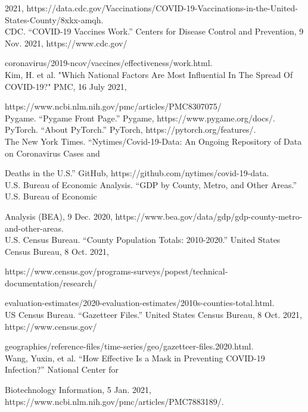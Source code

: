 \documentclass[fontsize=11pt]{article}
\begin{document}
    2021, https://data.cdc.gov/Vaccinations/COVID-19-Vaccinations-in-the-United-States-County/8xkx-amqh. \\
    CDC. “COVID-19 Vaccines Work.” Centers for Disease Control and Prevention, 9 Nov. 2021, https://www.cdc.gov/
    
    coronavirus/2019-ncov/vaccines/effectiveness/work.html. \\
    Kim, H. et al. "Which National Factors Are Most Influential In The Spread Of COVID-19?" PMC, 16 July 2021, 
    
    https://www.ncbi.nlm.nih.gov/pmc/articles/PMC8307075/  \\
    Pygame. “Pygame Front Page.” Pygame, https://www.pygame.org/docs/. \\
    PyTorch. “About PyTorch.” PyTorch, https://pytorch.org/features/. \\
    The New York Times. “Nytimes/Covid-19-Data: An Ongoing Repository of Data on Coronavirus Cases and

    Deaths in the U.S.” GitHub, https://github.com/nytimes/covid-19-data. \\
    U.S. Bureau of Economic Analysis. “GDP by County, Metro, and Other Areas.” U.S. Bureau of Economic

    Analysis (BEA), 9 Dec. 2020, https://www.bea.gov/data/gdp/gdp-county-metro-and-other-areas. \\
    U.S. Census Bureau. “County Population Totals: 2010-2020.” United States Census Bureau, 8 Oct. 2021,

    https://www.census.gov/programs-surveys/popest/technical-documentation/research/

    evaluation-estimates/2020-evaluation-estimates/2010s-counties-total.html. \\
    US Census Bureau. “Gazetteer Files.” United States Census Bureau, 8 Oct. 2021, https://www.census.gov/

    geographies/reference-files/time-series/geo/gazetteer-files.2020.html. \\
Wang, Yuxin, et al. “How Effective Is a Mask in Preventing COVID-19 Infection?” National Center for 

Biotechnology Information, 5 Jan. 2021, https://www.ncbi.nlm.nih.gov/pmc/articles/PMC7883189/. \\
\end{document}
